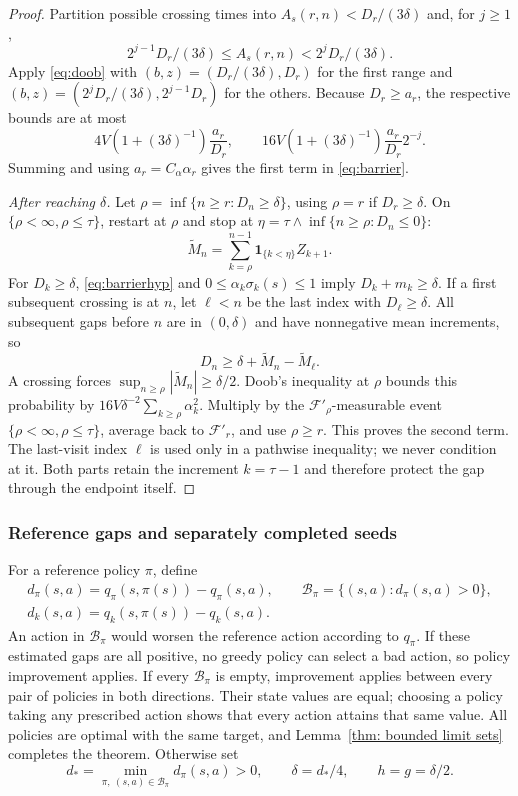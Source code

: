 \begin{proof}
Partition possible crossing times into $A_s(r,n)<D_r/(3\delta)$ and, for $j\ge1$,
\[
2^{j-1}D_r/(3\delta)\le A_s(r,n)<2^jD_r/(3\delta).
\]
Apply \eqref{eq:doob} with $(b,z)=(D_r/(3\delta),D_r)$ for the first range and $(b,z)=(2^jD_r/(3\delta),2^{j-1}D_r)$
for the others. Because $D_r\ge a_r$, the respective bounds are at most
\[
4V(1+(3\delta)^{-1})\frac{a_r}{D_r},\qquad
16V(1+(3\delta)^{-1})\frac{a_r}{D_r}2^{-j}.
\]
Summing and using $a_r=C_\alpha\alpha_r$ gives the first term in \eqref{eq:barrier}.

\emph{After reaching $\delta$.} Let $\rho=\inf\{n\ge r:D_n\ge\delta\}$, using $\rho=r$ if $D_r\ge\delta$. On $\{\rho<\infty,\rho\le\tau\}$,
restart at $\rho$ and stop at $\eta=\tau\wedge\inf\{n\ge\rho:D_n\le0\}$:
\[
\widetilde M_n=\sum_{k=\rho}^{n-1}\mathbf1_{\{k<\eta\}}Z_{k+1}.
\]
For $D_k\ge\delta$, \eqref{eq:barrierhyp} and $0\le\alpha_k\sigma_k(s)\le1$ imply $D_k+m_k\ge\delta$. If a first subsequent crossing is
at $n$, let $\ell<n$ be the last index with $D_\ell\ge\delta$. All subsequent gaps before $n$ are in $(0,\delta)$ and
have nonnegative mean increments, so
\[
D_n\ge\delta+\widetilde M_n-\widetilde M_\ell.
\]
A crossing forces $\sup_{n\ge\rho}|\widetilde M_n|\ge\delta/2$. Doob's inequality at $\rho$ bounds this probability by
$16V\delta^{-2}\sum_{k\ge\rho}\alpha_k^2$. Multiply by the $\mathcal F'_\rho$-measurable event $\{\rho<\infty,\rho\le\tau\}$, average back to $\mathcal F'_r$,
and use $\rho\ge r$. This proves the second term. The last-visit index $\ell$ is used only in a pathwise
inequality; we never condition at it. Both parts retain the increment $k=\tau-1$ and therefore
protect the gap through the endpoint itself.
\end{proof}

\subsubsection{Reference gaps and separately completed seeds}
For a reference policy $\pi$, define
\begin{equation}\label{eq:gaps}
\begin{gathered}
d_\pi(s,a)=q_\pi(s,\pi(s))-q_\pi(s,a),\qquad
\mathcal B_\pi=\{(s,a):d_\pi(s,a)>0\},\\
d_k(s,a)=q_k(s,\pi(s))-q_k(s,a).
\end{gathered}
\end{equation}
An action in $\mathcal B_\pi$ would worsen the reference action according to $q_\pi$. If these estimated gaps
are all positive, no greedy policy can select a bad action, so policy improvement applies. If
every $\mathcal B_\pi$ is empty, improvement applies between every pair of policies in both directions.
Their state values are equal; choosing a policy taking any prescribed action shows that every
action attains that same value. All policies are optimal with the same target, and Lemma~\ref{thm: bounded limit sets}
completes the theorem. Otherwise set
\begin{equation}\label{eq:constants}
d_* = \min_{\pi,\ (s,a)\in\mathcal B_\pi}d_\pi(s,a)>0,\qquad
\delta=d_*/4,\qquad h=g=\delta/2.
\end{equation}

